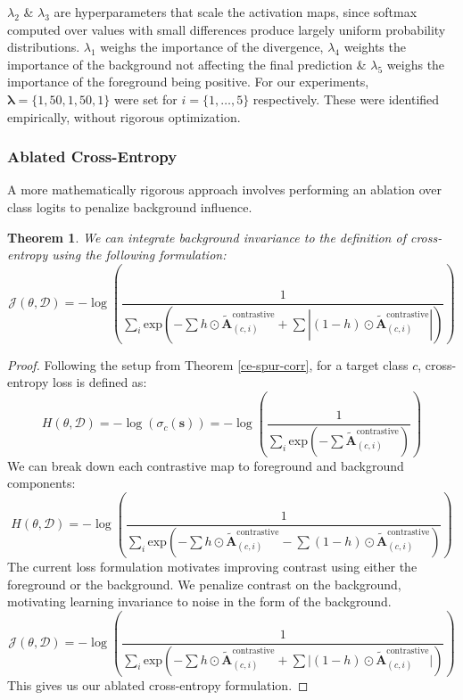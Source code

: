 \documentclass{article}
\theoremstyle{plain}
\newtheorem{theorem}{Theorem}[section]
\theoremstyle{definition}
\theoremstyle{remark}
\newcommand{\contcam}[2]{\tilde{\mathcal{\bm{A}}}^{\text{contrastive}}_{(#1, #2)}}
\begin{document}
$\lambda_2$ \& $\lambda_3$ are hyperparameters that scale the activation maps, since softmax computed over values with small differences produce largely uniform probability distributions. $\lambda_1$ weighs the importance of the divergence, $\lambda_4$ weights the importance of the background not affecting the final prediction \& $\lambda_5$ weighs the importance of the foreground being positive. For our experiments, $\bm{\lambda} = \{1, 50, 1, 50, 1\}$ were set for $i = \{1, \ldots, 5\}$ respectively. These were identified empirically, without rigorous optimization.

\subsubsection{Ablated Cross-Entropy}

A more mathematically rigorous approach involves performing an ablation over class logits to penalize background influence.

\begin{theorem}\label{ace}
	We can integrate background invariance to the definition of cross-entropy using the following formulation:
	\begin{equation}
		\mathcal{J}(\theta, \mathcal{D}) = -\log \left( \frac{1}{\sum_i \text{exp}\left(-\sum h \odot \contcam{c}{i} + \sum |(1-h) \odot \contcam{c}{i}|\right)} \right)
	\end{equation}
\end{theorem}
\begin{proof} Following the setup from Theorem \ref{ce-spur-corr}, for a target class $c$, cross-entropy loss is defined as:
	\begin{equation}
		H(\theta, \mathcal{D}) = -\log \left( \sigma_c(\bm{s}) \right) = -\log \left( \frac{1}{\sum_i \text{exp}({-\sum \contcam{c}{i}})} \right)
	\end{equation}
	We can break down each contrastive map to foreground and background components:
	\begin{equation}
		H(\theta, \mathcal{D}) = -\log \left( \frac{1}{\sum_i \text{exp}\left({-\sum h \odot \contcam{c}{i} - \sum (1-h) \odot \contcam{c}{i}}\right)} \right)
	\end{equation}
	The current loss formulation motivates improving contrast using either the foreground or the background. We penalize contrast on the background, motivating learning invariance to noise in the form of the background.
	\begin{equation}
		\mathcal{J}(\theta, \mathcal{D}) = -\log \left( \frac{1}{\sum_i \text{exp}\left({-\sum h \odot \contcam{c}{i} + \sum |(1-h) \odot \contcam{c}{i}}|\right)} \right)
	\end{equation}
	This gives us our ablated cross-entropy formulation.
\end{proof}
\end{document}
